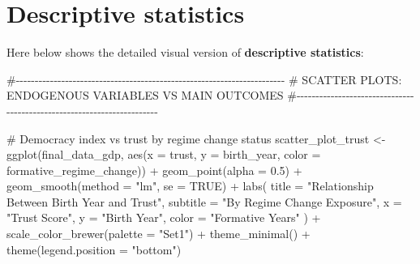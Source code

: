 \documentclass[
  letterpaper,
  DIV=11,
  numbers=noendperiod]{scrartcl}
\newenvironment{Shaded}{\begin{snugshade}}{\end{snugshade}}
\newcommand{\AttributeTok}[1]{\textcolor[rgb]{0.40,0.45,0.13}{#1}}
\newcommand{\CommentTok}[1]{\textcolor[rgb]{0.37,0.37,0.37}{#1}}
\newcommand{\ConstantTok}[1]{\textcolor[rgb]{0.56,0.35,0.01}{#1}}
\newcommand{\FloatTok}[1]{\textcolor[rgb]{0.68,0.00,0.00}{#1}}
\newcommand{\FunctionTok}[1]{\textcolor[rgb]{0.28,0.35,0.67}{#1}}
\newcommand{\NormalTok}[1]{\textcolor[rgb]{0.00,0.23,0.31}{#1}}
\newcommand{\OtherTok}[1]{\textcolor[rgb]{0.00,0.23,0.31}{#1}}
\newcommand{\SpecialCharTok}[1]{\textcolor[rgb]{0.37,0.37,0.37}{#1}}
\newcommand{\StringTok}[1]{\textcolor[rgb]{0.13,0.47,0.30}{#1}}
\begin{document}
\hypertarget{descriptive-statistics}{%
\section{\texorpdfstring{\textbf{Descriptive
statistics}}{Descriptive statistics}}\label{descriptive-statistics}}

Here below shows the detailed visual version of \textbf{descriptive
statistics}:

\begin{Shaded}
\begin{Highlighting}[]
\CommentTok{\#{-}{-}{-}{-}{-}{-}{-}{-}{-}{-}{-}{-}{-}{-}{-}{-}{-}{-}{-}{-}{-}{-}{-}{-}{-}{-}{-}{-}{-}{-}{-}{-}{-}{-}{-}{-}{-}{-}{-}{-}{-}{-}{-}{-}{-}{-}{-}{-}{-}{-}{-}{-}{-}{-}{-}{-}{-}{-}{-}{-}{-}{-}{-}{-}{-}{-}{-}{-}{-}{-}{-}}
\CommentTok{\# SCATTER PLOTS: ENDOGENOUS VARIABLES VS MAIN OUTCOMES}
\CommentTok{\#{-}{-}{-}{-}{-}{-}{-}{-}{-}{-}{-}{-}{-}{-}{-}{-}{-}{-}{-}{-}{-}{-}{-}{-}{-}{-}{-}{-}{-}{-}{-}{-}{-}{-}{-}{-}{-}{-}{-}{-}{-}{-}{-}{-}{-}{-}{-}{-}{-}{-}{-}{-}{-}{-}{-}{-}{-}{-}{-}{-}{-}{-}{-}{-}{-}{-}{-}{-}{-}{-}{-}}

\CommentTok{\# Democracy index vs trust by regime change status}
\NormalTok{scatter\_plot\_trust }\OtherTok{\textless{}{-}} \FunctionTok{ggplot}\NormalTok{(final\_data\_gdp, }\FunctionTok{aes}\NormalTok{(}\AttributeTok{x =}\NormalTok{ trust, }\AttributeTok{y =}\NormalTok{ birth\_year, }\AttributeTok{color =}\NormalTok{ formative\_regime\_change)) }\SpecialCharTok{+}
  \FunctionTok{geom\_point}\NormalTok{(}\AttributeTok{alpha =} \FloatTok{0.5}\NormalTok{) }\SpecialCharTok{+}
  \FunctionTok{geom\_smooth}\NormalTok{(}\AttributeTok{method =} \StringTok{"lm"}\NormalTok{, }\AttributeTok{se =} \ConstantTok{TRUE}\NormalTok{) }\SpecialCharTok{+}
  \FunctionTok{labs}\NormalTok{(}
    \AttributeTok{title =} \StringTok{"Relationship Between Birth Year and Trust"}\NormalTok{,}
    \AttributeTok{subtitle =} \StringTok{"By Regime Change Exposure"}\NormalTok{,}
    \AttributeTok{x =} \StringTok{"Trust Score"}\NormalTok{,}
    \AttributeTok{y =} \StringTok{"Birth Year"}\NormalTok{,}
    \AttributeTok{color =} \StringTok{"Formative Years"}
\NormalTok{  ) }\SpecialCharTok{+}
  \FunctionTok{scale\_color\_brewer}\NormalTok{(}\AttributeTok{palette =} \StringTok{"Set1"}\NormalTok{) }\SpecialCharTok{+}
  \FunctionTok{theme\_minimal}\NormalTok{() }\SpecialCharTok{+}
  \FunctionTok{theme}\NormalTok{(}\AttributeTok{legend.position =} \StringTok{"bottom"}\NormalTok{)}


\end{Highlighting}
\end{Shaded}
\end{document}
